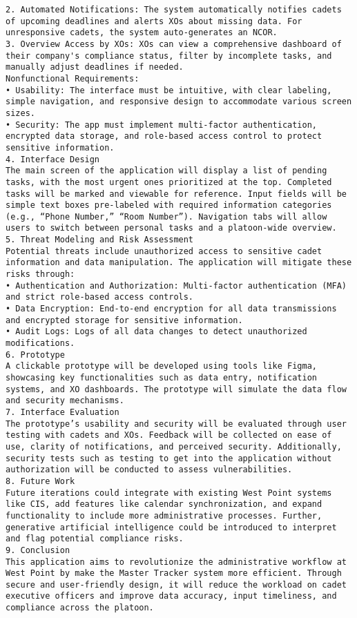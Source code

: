 \documentclass [11pt]{article}
\begin{document}
\begin{lstlisting}
2. Automated Notifications: The system automatically notifies cadets of upcoming deadlines and alerts XOs about missing data. For unresponsive cadets, the system auto-generates an NCOR.
3. Overview Access by XOs: XOs can view a comprehensive dashboard of their company's compliance status, filter by incomplete tasks, and manually adjust deadlines if needed.
Nonfunctional Requirements:
• Usability: The interface must be intuitive, with clear labeling, simple navigation, and responsive design to accommodate various screen sizes.
• Security: The app must implement multi-factor authentication, encrypted data storage, and role-based access control to protect sensitive information.
4. Interface Design
The main screen of the application will display a list of pending tasks, with the most urgent ones prioritized at the top. Completed tasks will be marked and viewable for reference. Input fields will be simple text boxes pre-labeled with required information categories (e.g., “Phone Number,” “Room Number”). Navigation tabs will allow users to switch between personal tasks and a platoon-wide overview.
5. Threat Modeling and Risk Assessment
Potential threats include unauthorized access to sensitive cadet information and data manipulation. The application will mitigate these risks through:
• Authentication and Authorization: Multi-factor authentication (MFA) and strict role-based access controls.
• Data Encryption: End-to-end encryption for all data transmissions and encrypted storage for sensitive information.
• Audit Logs: Logs of all data changes to detect unauthorized modifications.
6. Prototype
A clickable prototype will be developed using tools like Figma, showcasing key functionalities such as data entry, notification systems, and XO dashboards. The prototype will simulate the data flow and security mechanisms.
7. Interface Evaluation
The prototype’s usability and security will be evaluated through user testing with cadets and XOs. Feedback will be collected on ease of use, clarity of notifications, and perceived security. Additionally, security tests such as testing to get into the application without authorization will be conducted to assess vulnerabilities.
8. Future Work
Future iterations could integrate with existing West Point systems like CIS, add features like calendar synchronization, and expand functionality to include more administrative processes. Further, generative artificial intelligence could be introduced to interpret and flag potential compliance risks.
9. Conclusion
This application aims to revolutionize the administrative workflow at West Point by make the Master Tracker system more efficient. Through secure and user-friendly design, it will reduce the workload on cadet executive officers and improve data accuracy, input timeliness, and compliance across the platoon.


\end{lstlisting}
\end{document}
